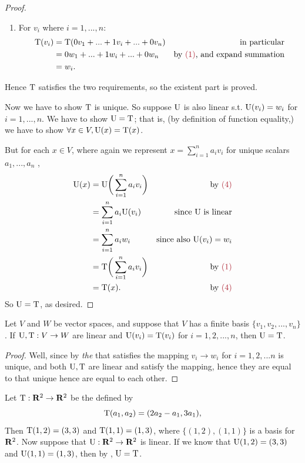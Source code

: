 \begin{proof}
\begin{enumerate}
\item
For \(v_i\) where \(i = 1, ..., n\):
\begin{align*}
    \T(v_i) & = \T(0 v_1 + ... + 1 v_i + ... + 0 v_n) & \text{in particular} \\
            & = 0 w_1 + ... + 1 w_i + ... + 0 w_n & \text{by \MAROON{(1)}, and expand summation} \\
            & = w_i.
\end{align*}
\end{enumerate}
Hence \(\mathrm{T}\) satisfies the two requirements, so the existent part is proved.

Now we have to show \(\mathrm{T}\) is unique.
So suppose \(\mathrm{U}\) is also linear s.t. \(\mathrm{U}(v_i) = w_i\) for \(i = 1, ..., n\).
We have to show \(\mathrm{U} = \mathrm{T}\);
that is, (by definition of function equality,) we have to show \(\forall x \in V, \mathrm{U}(x) = \mathrm{T}(x)\).

But for each \(x \in V\), where again we represent \(x = \sum_{i = 1}^n a_i v_i\) for unique scalars \(a_1, ..., a_n\) ,
\begin{align*}
    \U(x) & = \U\bigg(\sum_{i = 1}^n a_i v_i\bigg) & \text{by \MAROON{(4)}}\\
           & = \sum_{i = 1}^n a_i \U(v_i) & \text{since \(\U\) is linear} \\
           & = \sum_{i = 1}^n a_i w_i & \text{since also \(\U(v_i) = w_i\)} \\
           & = \T\bigg(\sum_{i = 1}^n a_i v_i\bigg) & \text{by \MAROON{(1)}} \\
           & = \T(x). & \text{by \MAROON{(4)}}
\end{align*}
So \(\mathrm{U} = \mathrm{T}\), as desired.
\end{proof}

\begin{corollary} \label{corollary 2.6.1}
\sloppy Let \(V\) and \(W\) be vector spaces, and suppose that \(V\) has a finite basis \(\{ v_1, v_2, ..., v_n \}\).
If \(\mathrm{U}, \mathrm{T} : V \to W\) are linear and \(\mathrm{U}(v_i) = \mathrm{T}(v_i)\) for \(i = 1, 2, ..., n\), then \(\mathrm{U} = \mathrm{T}\).
\end{corollary}

\begin{proof}
Well, since by  \emph{the} \LTRAN{} that satisfies the mapping \(v_i \to w_i\) for \(i = 1, 2, ... n\) is unique,
and both \(\mathrm{U}, \mathrm{T}\) are linear and satisfy the mapping, hence they are equal to that unique \LTRAN{} hence are equal to each other.
\end{proof}

\begin{example} \label{example 2.1.14}
Let \(\mathrm{T} : \mathbf{R}^2 \to \mathbf{R}^2\) be the \LTRAN{} defined by
\[
    \mathrm{T}(a_1, a_2) = (2 a_2 - a_1, 3 a_1),
\]
Then \(\mathrm{T}(1, 2) = (3, 3)\) and \(\mathrm{T}(1, 1) = (1, 3)\), where \(\{ (1, 2), (1, 1) \}\) is a basis for \(\mathbf{R}^2\).
Now suppose that \(\mathrm{U} : \mathbf{R}^2 \to \mathbf{R}^2\) is linear.
If we know that \(\mathrm{U}(1, 2) = (3, 3)\) and \(\mathrm{U}(1, 1) = (1, 3)\), then by , \(\mathrm{U} = \mathrm{T}\).
\end{example}
